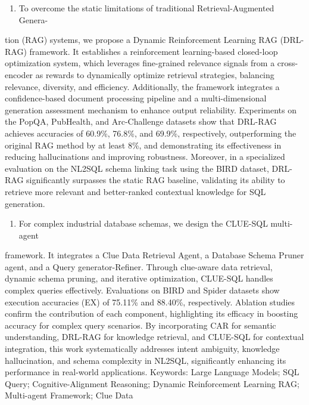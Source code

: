 \documentclass[12pt,a4paper,openright,UTF8]{ctexbook}
\begin{document}
\begin{enumerate}[label=(\arabic*)]
\item To overcome the static limitations of traditional Retrieval-Augmented Genera-
\end{enumerate}
tion (RAG) systems, we propose a Dynamic Reinforcement Learning RAG (DRL-RAG) framework. It establishes a reinforcement learning-based closed-loop optimization system, which leverages fine-grained relevance signals from a cross-encoder as rewards to dynamically optimize retrieval strategies, balancing relevance, diversity, and efficiency. Additionally, the framework integrates a confidence-based document processing pipeline and a multi-dimensional generation assessment mechanism to enhance output reliability. Experiments on the PopQA, PubHealth, and Arc-Challenge datasets show that DRL-RAG achieves accuracies of 60.9\%, 76.8\%, and 69.9\%, respectively, outperforming the original RAG method by at least 8\%, and demonstrating its effectiveness in reducing hallucinations and improving robustness. Moreover, in a specialized evaluation on the NL2SQL schema linking task using the BIRD dataset, DRL-RAG significantly surpasses the static RAG baseline, validating its ability to retrieve more relevant and better-ranked contextual knowledge for SQL generation.

\begin{enumerate}[label=(\arabic*)]
\item For complex industrial database schemas, we design the CLUE-SQL multi-agent
\end{enumerate}
framework. It integrates a Clue Data Retrieval Agent, a Database Schema Pruner agent, and a Query generator-Refiner. Through clue-aware data retrieval, dynamic schema pruning, and iterative optimization, CLUE-SQL handles complex queries effectively. Evaluations on BIRD and Spider datasets show execution accuracies (EX) of 75.11\% and 88.40\%, respectively. Ablation studies confirm the contribution of each component, highlighting its efficacy in boosting accuracy for complex query scenarios. By incorporating CAR for semantic understanding, DRL-RAG for knowledge retrieval, and CLUE-SQL for contextual integration, this work systematically addresses intent ambiguity, knowledge hallucination, and schema complexity in NL2SQL, significantly enhancing its performance in real-world applications. Keywords: Large Language Models; SQL Query; Cognitive-Alignment Reasoning; Dynamic Reinforcement Learning RAG; Multi-agent Framework; Clue Data
\end{document}
